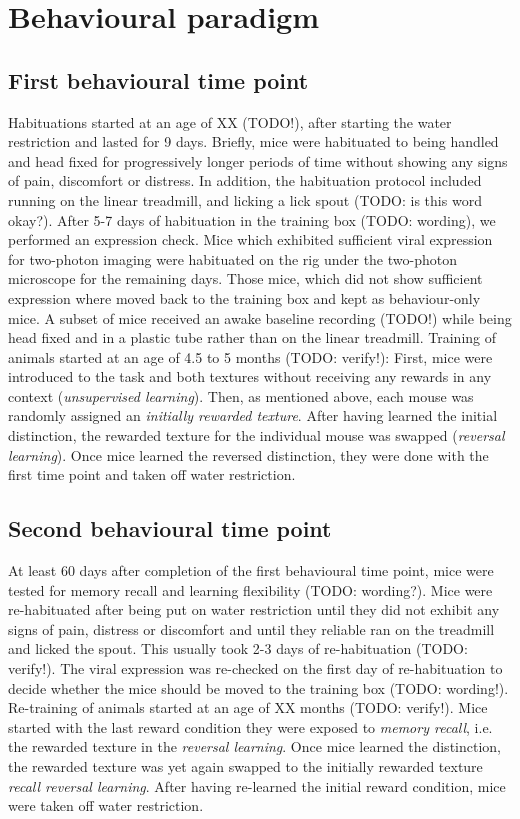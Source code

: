\section{Behavioural paradigm}
\subsection{First behavioural time point}
Habituations started at an age of XX (TODO!), after starting the water restriction and lasted for 9 days. Briefly, mice were habituated to being handled and head fixed for progressively longer periods of time without showing any signs of pain, discomfort or distress. In addition, the habituation protocol included running on the linear treadmill, and licking a lick spout (TODO: is this word okay?). After 5-7 days of habituation in the training box (TODO: wording), we performed an expression check. Mice which exhibited sufficient viral expression for two-photon imaging were habituated on the rig under the two-photon microscope for the remaining days. Those mice, which did not show sufficient expression where moved back to the training box and kept as behaviour-only mice.
A subset of mice received an awake baseline recording (TODO!) while being head fixed and in a plastic tube rather than on the linear treadmill.
Training of animals started at an age of 4.5 to 5 months (TODO: verify!): First, mice were introduced to the task and both textures without receiving any rewards in any context (\textit{unsupervised learning}). Then, as mentioned above, each mouse was randomly assigned an \textit{initially rewarded texture}. After having learned the initial distinction, the rewarded texture for the individual mouse was swapped (\textit{reversal learning}). Once mice learned the reversed distinction, they were done with the first time point and taken off water restriction.
\subsection{Second behavioural time point}
At least 60 days after completion of the first behavioural time point, mice were tested for memory recall and learning flexibility (TODO: wording?).
Mice were re-habituated after being put on water restriction until they did not exhibit any signs of pain, distress or discomfort and until they reliable ran on the treadmill and licked the spout. This usually took 2-3 days of re-habituation (TODO: verify!). The viral expression was re-checked on the first day of re-habituation to decide whether the mice should be moved to the training box (TODO: wording!).
Re-training of animals started at an age of XX months (TODO: verify!). Mice started with the last reward condition they were exposed to \textit{memory recall}, i.e. the rewarded texture in the \textit{reversal learning}. Once mice learned the distinction, the rewarded texture was yet again swapped to the initially rewarded texture \textit{recall reversal learning}. After having re-learned the initial reward condition, mice were taken off water restriction.
